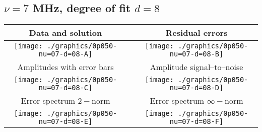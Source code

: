 

% 

\clearpage{}
\break{}

\subsection{$\nu = 7$ MHz, degree of fit $d = 8$}

\begin{table}[h]
    \begin{center}
        \begin{tabular}{ccc}
            Data and solution & \quad & Residual errors \\\hline
            \texttt{[image: ./graphics/0p050-nu=07-d=08-A]} &&
            \texttt{[image: ./graphics/0p050-nu=07-d=08-B]} \\[15pt]
            Amplitudes with error bars && Amplitude signal--to--noise \\\hline
            \texttt{[image: ./graphics/0p050-nu=07-d=08-C]} &&
            \texttt{[image: ./graphics/0p050-nu=07-d=08-D]} \\[15pt]
            Error spectrum $2-$norm && Error spectrum $\infty-$norm \\\hline
            \texttt{[image: ./graphics/0p050-nu=07-d=08-E]} &&
            \texttt{[image: ./graphics/0p050-nu=07-d=08-F]} \\[15pt]
        \end{tabular}
    \end{center}
\label{fig:elev=50, nu=7}
\end{table}



\endinput
